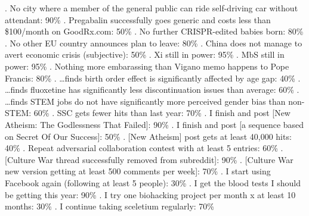 \begin{xmlentries}
\begin{xmlentriescontent}
{  . No city where a member of the general public can ride self-driving car without attendant: 90\% \htmlbr
  . Pregabalin successfully goes generic and costs less than \$100/month on GoodRx.com: 50\% . No further CRISPR-edited babies born: 80\%
  \htmlbr
  \htmlbr
  . No other EU country announces plan to leave: 80\% . China does not manage to avert economic crisis (subjective): 50\% . Xi still in power: 95\% . MbS still in power: 95\% \htmlbr
  . Nothing more embarassing than Vigano memo happens to Pope Francis: 80\%
  . …finds birth order effect is significantly affected by age gap: 40\% . …finds fluoxetine has significantly less discontinuation issues than average: 60\% . …finds STEM jobs do not have significantly more perceived gender bias than non-STEM: 60\% \htmlbr
  . SSC gets fewer hits than last year: 70\% . I finish and post [New Atheism: The Godlessness That Failed]: 90\% \htmlbr
  . I finish and post [a sequence based on Secret Of Our Success]: 50\% . [New Atheism] post gets at least 40,000 hits: 40\% \htmlbr
  \htmlbr
  . Repeat adversarial collaboration contest with at least 5 entries: 60\% . [Culture War thread successfully removed from subreddit]: 90\% . [Culture War new version getting at least 500 comments per week]: 70\% \htmlbr
  . I start using Facebook again (following at least 5 people): 30\%
  . I get the blood tests I should be getting this year: 90\% . I try one biohacking project per month x at least 10 months: 30\% . I continue taking sceletium regularly: 70\% \htmlbr
  \htmlbr
  \htmlbr
}
\end{xmlentriescontent}
\end{xmlentries}
